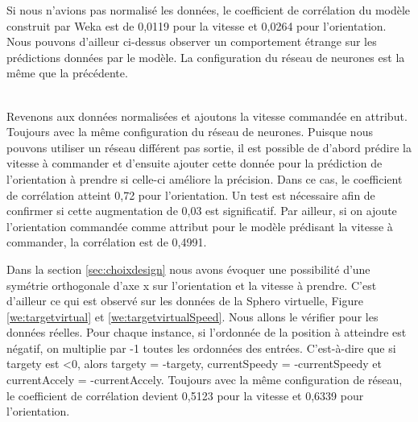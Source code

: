 Si nous n'avions pas normalisé les données, le coefficient de corrélation du modèle construit par Weka est de 0,0119 pour la vitesse et 0,0264 pour l'orientation.
Nous pouvons d'ailleur ci-dessus observer un comportement étrange sur les prédictions données par le modèle.
La configuration du réseau de neurones est la même que la précédente.

\\

Revenons aux données normalisées et ajoutons la vitesse commandée en attribut.
Toujours avec la même configuration du réseau de neurones.
Puisque nous pouvons utiliser un réseau différent pas sortie, il est possible de d'abord prédire la vitesse à commander et d'ensuite ajouter cette donnée pour la prédiction de l'orientation à prendre si celle-ci améliore la précision.
Dans ce cas, le coefficient de corrélation atteint 0,72 pour l'orientation.
Un test est nécessaire afin de confirmer si cette augmentation de 0,03 est significatif.
Par ailleur, si on ajoute l'orientation commandée comme attribut pour le modèle prédisant la vitesse à commander, la corrélation est de 0,4991.

Dans la section \ref{sec:choixdesign} nous avons évoquer une possibilité d'une symétrie orthogonale d'axe x sur l'orientation et la vitesse à prendre.
C'est d'ailleur ce qui est observé sur les données de la Sphero virtuelle, Figure \ref{we:targetvirtual} et \ref{we:targetvirtualSpeed}.
Nous allons le vérifier pour les données réelles.
Pour chaque instance, si l'ordonnée de la position à atteindre est négatif, on multiplie par -1 toutes les ordonnées des entrées.
C'est-à-dire que si targety est <0, alors targety = -targety, currentSpeedy = -currentSpeedy et currentAccely = -currentAccely.
Toujours avec la même configuration de réseau, le coefficient de corrélation devient 0,5123 pour la vitesse et 0,6339 pour l'orientation.

